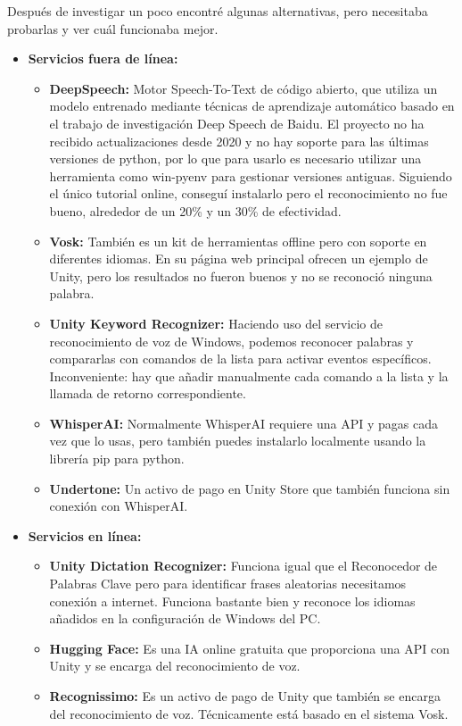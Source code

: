 Después de investigar un poco encontré algunas alternativas, pero necesitaba probarlas y ver cuál funcionaba mejor.
\begin{itemize}
   \item \textbf{Servicios fuera de línea:}
   \begin{itemize}
      \item \textbf{DeepSpeech:}
      Motor Speech-To-Text de código abierto, que utiliza un modelo entrenado mediante técnicas de aprendizaje automático basado en el trabajo de investigación Deep Speech de Baidu. El proyecto no ha recibido actualizaciones desde 2020 y no hay soporte para las últimas versiones de python, por lo que para usarlo es necesario utilizar una herramienta como win-pyenv para gestionar versiones antiguas. Siguiendo el único tutorial online, conseguí instalarlo pero el reconocimiento no fue bueno, alrededor de un 20\% y un 30\% de efectividad.
      \item \textbf{Vosk:}
      También es un kit de herramientas offline pero con soporte en diferentes idiomas. En su página web principal ofrecen un ejemplo de Unity, pero los resultados no fueron buenos y no se reconoció ninguna palabra.
      \item \textbf{Unity Keyword Recognizer:}
      Haciendo uso del servicio de reconocimiento de voz de Windows, podemos reconocer palabras y compararlas con comandos de la lista para activar eventos específicos. Inconveniente: hay que añadir manualmente cada comando a la lista y la llamada de retorno correspondiente.
      \item \textbf{WhisperAI:}
      Normalmente WhisperAI requiere una API y pagas cada vez que lo usas, pero también puedes instalarlo localmente usando la librería pip para python.
      \item \textbf{Undertone:}
      Un activo de pago en Unity Store que también funciona sin conexión con WhisperAI.   \end{itemize}
   \item \textbf{Servicios en línea:}
   \begin{itemize}
      \item \textbf{Unity Dictation Recognizer:}
      Funciona igual que el Reconocedor de Palabras Clave pero para identificar frases aleatorias necesitamos conexión a internet. Funciona bastante bien y reconoce los idiomas añadidos en la configuración de Windows del PC.
      \item \textbf{Hugging Face:}
      Es una IA online gratuita que proporciona una API con Unity y se encarga del reconocimiento de voz.
      \item \textbf{Recognissimo:}
      Es un activo de pago de Unity que también se encarga del reconocimiento de voz. Técnicamente está basado en el sistema Vosk.
   \end{itemize}
\end{itemize}

